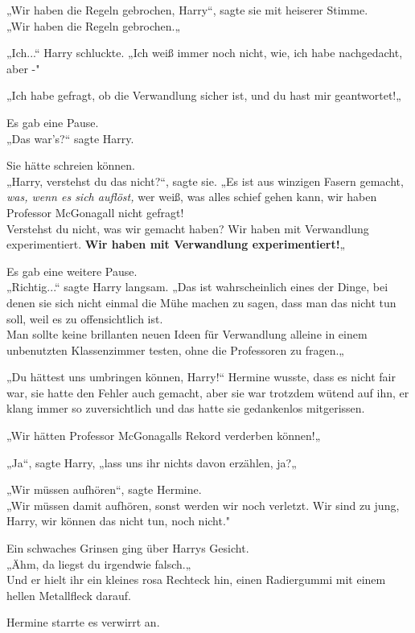 {„Wir haben die Regeln gebrochen, Harry“, sagte sie mit heiserer Stimme.\\ „Wir haben die Regeln gebrochen.„

„Ich...“ Harry schluckte. „Ich weiß immer noch nicht, wie, ich habe nachgedacht, aber -"

„Ich habe gefragt, ob die Verwandlung sicher ist, und du hast mir geantwortet!„

Es gab eine Pause.\\ „Das war's?“ sagte Harry.

Sie hätte schreien können.\\ „Harry, verstehst du das nicht?“, sagte sie. „Es ist aus winzigen Fasern gemacht, \emph{was, wenn es sich auflöst,} wer weiß, was alles schief gehen kann, wir haben Professor McGonagall nicht gefragt!\\ Verstehst du nicht, was wir gemacht haben? Wir haben mit Verwandlung experimentiert. \textbf{Wir haben mit Verwandlung experimentiert!}„

Es gab eine weitere Pause.\\ „Richtig...“ sagte Harry langsam. „Das ist wahrscheinlich eines der Dinge, bei denen sie sich nicht einmal die Mühe machen zu sagen, dass man das nicht tun soll, weil es zu offensichtlich ist.\\ Man sollte keine brillanten neuen Ideen für Verwandlung alleine in einem unbenutzten Klassenzimmer testen, ohne die Professoren zu fragen.„

„Du hättest uns umbringen können, Harry!“ Hermine wusste, dass es nicht fair war, sie hatte den Fehler auch gemacht, aber sie war trotzdem wütend auf ihn, er klang immer so zuversichtlich und das hatte sie gedankenlos mitgerissen.

„Wir hätten Professor McGonagalls Rekord verderben können!„

„Ja“, sagte Harry, „lass uns ihr nichts davon erzählen, ja?„

„Wir müssen aufhören“, sagte Hermine.\\ „Wir müssen damit aufhören, sonst werden wir noch verletzt. Wir sind zu jung, Harry, wir können das nicht tun, noch nicht."

Ein schwaches Grinsen ging über Harrys Gesicht.\\ „Ähm, da liegst du irgendwie falsch.„\\ Und er hielt ihr ein kleines rosa Rechteck hin, einen Radiergummi mit einem hellen Metallfleck darauf.

Hermine starrte es verwirrt an.

}
